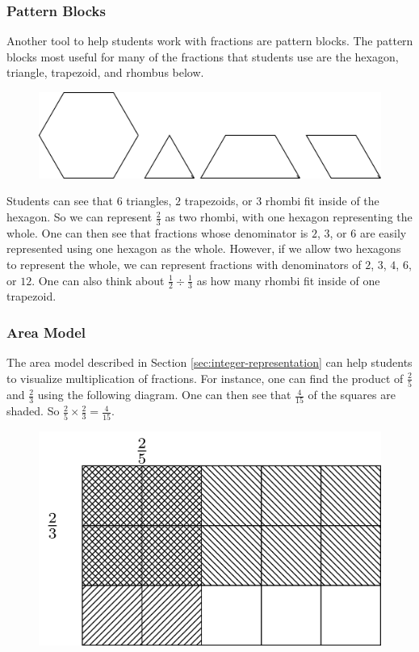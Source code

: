 \documentclass[
]{book}
\theoremstyle{definition}
\theoremstyle{definition}
\theoremstyle{definition}
\theoremstyle{remark}
\begin{document}
\hypertarget{pattern-blocks}{%
\subsubsection{Pattern Blocks}\label{pattern-blocks}}

Another tool to help students work with fractions are pattern blocks. The pattern blocks most useful for many of the fractions that students use are the hexagon, triangle, trapezoid, and rhombus below.

\begin{figure}

{\centering \includegraphics[width=0.6\linewidth]{tikz/pattern-blocks} 

}

\end{figure}

Students can see that \(6\) triangles, \(2\) trapezoids, or \(3\) rhombi fit inside of the hexagon. So we can represent \(\frac{2}{3}\) as two rhombi, with one hexagon representing the whole. One can then see that fractions whose denominator is \(2\), \(3\), or \(6\) are easily represented using one hexagon as the whole. However, if we allow two hexagons to represent the whole, we can represent fractions with denominators of \(2\), \(3\), \(4\), \(6\), or \(12\). One can also think about \(\frac{1}{2} \div \frac{1}{3}\) as how many rhombi fit inside of one trapezoid.

\hypertarget{area-model}{%
\subsubsection{Area Model}\label{area-model}}

The area model described in Section \ref{sec:integer-representation} can help students to visualize multiplication of fractions. For instance, one can find the product of \(\frac{2}{5}\) and \(\frac{2}{3}\) using the following diagram. One can then see that \(\frac{4}{15}\) of the squares are shaded. So \(\frac{2}{5} \times \frac{2}{3} = \frac{4}{15}\).

\begin{figure}

{\centering \includegraphics[width=0.6\linewidth]{tikz/area-model-fractions} 

}

\end{figure}
\end{document}
